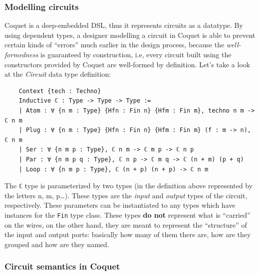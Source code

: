 \documentclass[a4paper]{article}
\begin{document}
            \subsubsection{Modelling circuits}
            \label{subsubsec:coquet-modelling}
                Coquet is a deep-embedded DSL, thus it represents circuits as a datatype. By using
                dependent types, a designer modelling a circuit in Coquet is able to prevent certain
                kinds of ``errors'' much earlier in the design process, because the
                \emph{well-formedness} is guaranteed by construction, i.e, every circuit built using
                the constructors provided by Coquet are well-formed by definition. Let's take a look
                at the \emph{Circuit} data type definition:
                \begin{verbatim}
    Context {tech : Techno}
    Inductive ℂ : Type -> Type -> Type :=
    | Atom : ∀ {n m : Type} {Hfn : Fin n} {Hfm : Fin m}, techno n m -> ℂ n m
    | Plug : ∀ {n m : Type} {Hfn : Fin n} {Hfm : Fin m} (f : m -> n), ℂ n m
    | Ser : ∀ {n m p : Type}, ℂ n m -> ℂ m p -> ℂ n p
    | Par : ∀ {n m p q : Type}, ℂ n p -> ℂ m q -> ℂ (n + m) (p + q)
    | Loop : ∀ {n m p : Type}, ℂ (n + p) (n + p) -> ℂ n m
                \end{verbatim}

                The \texttt{ℂ} type is parameterized by two types (in the definition above
                represented by the letters n, m, p\ldots). These types are the \emph{input} and
                \emph{output} types of the circuit, respectively. These parameters can be
                instantiated to any types which have instances for the \texttt{Fin} type class.
                These types \textbf{do not} represent what is ``carried'' on the wires, on the other
                hand, they are meant to represent the ``structure'' of the input and output ports:
                basically how many of them there are, how are they grouped and how are they named.




            \subsubsection{Circuit semantics in Coquet}
            \label{subsub:coquet-semantics}
\end{document}
